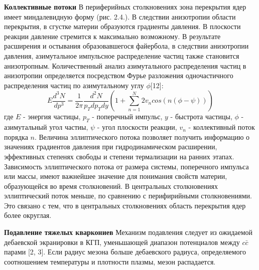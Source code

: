 \textbf{Коллективные потоки}
В периферийных столкновениях зона перекрытия ядер имеет миндалевидную форму (рис. 2.4.). В следствии анизотропии области перекрытия, в сгустке материи образуются градиенты давления. В плоскости реакции давление стремится к максимально возможному. В результате расширения и остывания образовавшегося файербола, в следствии анизотропии давления, азимутальное импульсное распределение частиц также становится анизотропным. Количественный анализ азимутального распределения частиц в анизотропии определяется посредством Фурье разложения одночастичного распределения частиц по азимутальному углу $\phi$[12]:
$$ E \frac{d^3N}{dp^3} = \frac{1}{2\pi} \frac{d^2N}{p_T dp_T dy} 
(1+\sum_{n=1}^{N} 2v_n cos(n(\phi - \psi)))$$
где $E$ - энергия частицы, 
$p_T$ - поперечный импульс,
$y$ - быстрота частицы, 
$\phi$ - азимутальный угол частиы, 
$\psi$ - угол плоскости реакции, 
$v_n$ - коллективный поток порядка $n$. 
Величина эллиптического потока позволяет получить информацию о значениях градиентов давления при гидродинамическом расширении, эффективных степенях свободы и степени термализации на ранних этапах. Зависимость эллиптического потока от размера системы, поперечного импульса или массы, имеют важнейшее значение для понимания свойств материи, образующейся во время столкновений. 
В центральных столкновениях эллиптический поток меньше, по сравнению с перифирийными столкновениями. Это связано с тем, что в центральных столкновениях область перекрытия ядер более округлая.

\textbf{Подавление тяжелых кваркониев}
Механизм подавления следует из ожидаемой дебаевской экранировки в КГП, уменьшающей диапазон потенциалов между $c\bar{c}$  парами [2, 3]. Если радиус мезона больше дебаевского радиуса, определяемого соотношением температуры и плотности плазмы, мезон распадается.

\begin{comment}
	Предполагается, что $J/\Psi$-мезон, состоящий из $c\bar{c}$-кварков, подходит для обнаружения эффекта экранирования Дебая по следующим причинам; 1) поскольку  $J/\Psi$-мезон измеряется в лептонном распаде, продукты распада не сильно взаимодействуют с другими адронами, поэтому ожидается проникающий зонд для ранней стадии столкновений, 2)  $J/\Psi$-мезон рождается на очень ранней стадии столкновение, 3) адронное взаимодействие  $J/\Psi$-мезон ожидается не слишком высоким (sYN $\gg$ 6 мб), таким образом, оно имеет информацию об условии начального состояния столкновений.
\end{comment}

